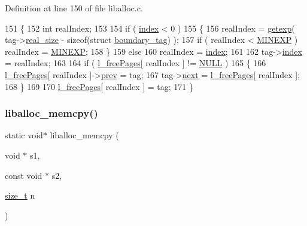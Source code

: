 Definition at line 150 of file liballoc.\+c.


\begin{DoxyCode}
151 \{
152     \textcolor{keywordtype}{int} realIndex;
153     
154     \textcolor{keywordflow}{if} ( \hyperlink{a00126_adfc426eed5361508d62c6e8f484bd270_adfc426eed5361508d62c6e8f484bd270}{index} < 0 ) 
155     \{
156         realIndex = \hyperlink{a00035_ab5fc0b977bf14bdb99c8b87cae451d42_ab5fc0b977bf14bdb99c8b87cae451d42}{getexp}( tag->\hyperlink{a00126_ad22b1c69bdce419783ac165f7f354245_ad22b1c69bdce419783ac165f7f354245}{real\_size} - \textcolor{keyword}{sizeof}(\textcolor{keyword}{struct} 
      \hyperlink{a00126}{boundary\_tag}) );
157         \textcolor{keywordflow}{if} ( realIndex < \hyperlink{a00035_ae7249b0af4d1bfe02a4c7bdbf810bd8c_ae7249b0af4d1bfe02a4c7bdbf810bd8c}{MINEXP} ) realIndex = \hyperlink{a00035_ae7249b0af4d1bfe02a4c7bdbf810bd8c_ae7249b0af4d1bfe02a4c7bdbf810bd8c}{MINEXP};
158     \}
159     \textcolor{keywordflow}{else}
160         realIndex = \hyperlink{a00126_adfc426eed5361508d62c6e8f484bd270_adfc426eed5361508d62c6e8f484bd270}{index};
161     
162     tag->\hyperlink{a00126_adfc426eed5361508d62c6e8f484bd270_adfc426eed5361508d62c6e8f484bd270}{index} = realIndex;
163     
164     \textcolor{keywordflow}{if} ( \hyperlink{a00035_a78b8b6e448179d3cd64915f99fee60e0_a78b8b6e448179d3cd64915f99fee60e0}{l\_freePages}[ realIndex ] != \hyperlink{a00038_a070d2ce7b6bb7e5c05602aa8c308d0c4_a070d2ce7b6bb7e5c05602aa8c308d0c4}{NULL} ) 
165     \{
166         \hyperlink{a00035_a78b8b6e448179d3cd64915f99fee60e0_a78b8b6e448179d3cd64915f99fee60e0}{l\_freePages}[ realIndex ]->\hyperlink{a00126_af5e6f310850e847ad873773f9ab8b902_af5e6f310850e847ad873773f9ab8b902}{prev} = tag;
167         tag->\hyperlink{a00126_a123f0bd815d7fda9f535b031640662fc_a123f0bd815d7fda9f535b031640662fc}{next} = \hyperlink{a00035_a78b8b6e448179d3cd64915f99fee60e0_a78b8b6e448179d3cd64915f99fee60e0}{l\_freePages}[ realIndex ];
168     \}
169 
170     \hyperlink{a00035_a78b8b6e448179d3cd64915f99fee60e0_a78b8b6e448179d3cd64915f99fee60e0}{l\_freePages}[ realIndex ] = tag;
171 \}
\end{DoxyCode}
\mbox{\label{a00035_a58b3101a659b6a2f7e2ca290bef6bfb4_a58b3101a659b6a2f7e2ca290bef6bfb4}} 
\subsubsection{\texorpdfstring{liballoc\+\_\+memcpy()}{liballoc\_memcpy()}}
{\footnotesize\ttfamily static void$\ast$ liballoc\+\_\+memcpy (\begin{DoxyParamCaption}\item[{void $\ast$}]{s1,  }\item[{const void $\ast$}]{s2,  }\item[{\hyperlink{a00038_a7c94ea6f8948649f8d181ae55911eeaf_a7c94ea6f8948649f8d181ae55911eeaf}{size\+\_\+t}}]{n }\end{DoxyParamCaption})\hspace{0.3cm}{\ttfamily [static]}}



